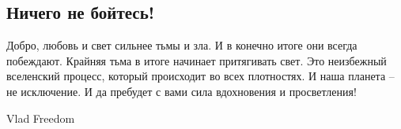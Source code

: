  
 
 
 
 

\subsection{Ничего не бойтесь!}
\label{sec:06_04_2021.fb.valen_valentina.1.strah}

Добро, любовь и свет сильнее тьмы и зла. И в конечно итоге они всегда
побеждают. Крайняя тьма в итоге начинает притягивать свет. Это неизбежный
вселенский процесс, который происходит во всех плотностях. И наша планета – не
исключение. И да пребудет с вами сила вдохновения и просветления!

Vlad Freedom
